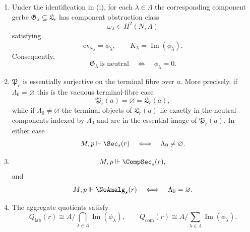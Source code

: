 \begin{theorem}
\begin{enumerate}[label=(\roman*),nosep]
\[
\Vis_{p,s}(r)\cong \Lambda.
\]
\item Under the identification in \textup{(i)}, for each $\lambda\in\Lambda$ the corresponding component gerbe $\mathfrak G_\lambda\subseteq \mathfrak L_r$ has component obstruction class
\[
\omega_\lambda\in H^2(N,A)
\]
satisfying
\[
\mathrm{ev}_{\omega_\lambda}=\phi_\lambda,
\qquad
K_\lambda=\operatorname{Im}(\phi_\lambda).
\]
Consequently,
\[
\mathfrak G_\lambda\ \text{is neutral}
\quad\Longleftrightarrow\quad
\phi_\lambda=0.
\]
\item $\mathfrak P_r$ is essentially surjective on the terminal fibre over $a$. More precisely, if $\Lambda_0=\varnothing$ this is the vacuous terminal-fibre case
\[
\mathfrak P_r(a)=\varnothing=\mathfrak L_r(a),
\]
while if $\Lambda_0\neq\varnothing$ the terminal objects of $\mathfrak L_r(a)$ lie exactly in the neutral components indexed by $\Lambda_0$ and are in the essential image of $\mathfrak P_r(a)$. In either case
\[
M,p\Vdash \Sec_s(r)
\quad\Longleftrightarrow\quad
\Lambda_0\neq\varnothing.
\]
\item
\[
M,p\Vdash \CompSec_s(r),
\]
and
\[
M,p\Vdash \NoAmalg_s(r)
\quad\Longleftrightarrow\quad
\Lambda_0=\varnothing.
\]
\item The aggregate quotients satisfy
\[
Q_{\mathrm{lab}}(r)\cong A\Big/\bigcap_{\lambda\in\Lambda}\operatorname{Im}(\phi_\lambda),
\qquad
Q_{\mathrm{com}}(r)\cong A\Big/\sum_{\lambda\in\Lambda}\operatorname{Im}(\phi_\lambda).
\]
\end{enumerate}
\end{theorem}

